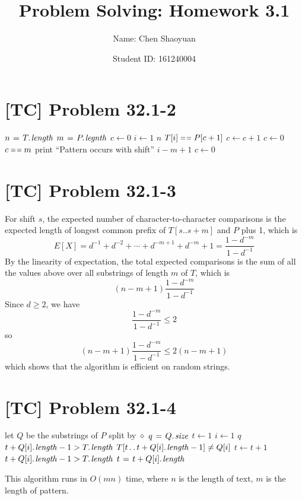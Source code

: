 \documentclass[a4paper,11pt,twocolumn]{article}
\newcommand{\homeworkno}{3.1}
\begin{document}
  \title{Problem Solving: Homework \homeworkno}
  \author{Name: Chen Shaoyuan \and Student ID: 161240004}
  \maketitle

  \section{[TC] Problem 32.1-2}
  \begin{codebox}
  \li $n \gets \attrib{T}{length}$
  \li $m \gets \attrib{P}{legnth}$
  \li $c \gets 0$
  \li \For $i \gets 1$ \To $n$
  \li \Do  \If $T[i] \isequal P[c+1]$
  \li      \Do $c \gets c + 1$
  \li      \Else
  \li          $c \gets 0$
           \End
  \li      \If $c \isequal m$
  \li      \Do print ``Pattern occurs with shift'' $i-m+1$
  \li          $c \gets 0$
           \End
       \End
  \end{codebox}

  \section{[TC] Problem 32.1-3}
  For shift $s$, the expected number of character-to-character comparisons is the expected length of longest common prefix of $T[s..s+m]$ and $P$ plus 1, which is
  $$ E[X] = d^{-1} + d^{-2} + \cdots + d^{-m+1} + d^{-m} + 1 = \frac{1-d^{-m}}{1-d^{-1}}$$
  By the linearity of expectation, the total expected comparisons is the sum of all the values above over all substrings of length $m$ of $T$, which is
  $$ (n-m+1) \frac{1-d^{-m}}{1-d^{-1}} $$
  Since $d \geq 2$, we have
  $$\frac{1-d^{-m}}{1-d^{-1}} \leq 2$$
  so
  $$ (n-m+1) \frac{1-d^{-m}}{1-d^{-1}} \leq 2(n-m+1) $$
  which shows that the algorithm is efficient on random strings.

  \section{[TC] Problem 32.1-4}
  \begin{codebox}
  \li let $Q$ be the substrings of $P$ split by $\diamond$
  \li $q \gets \attrib{Q}{size}$
  \li $t \gets 1$
  \li \For $i \gets 1$ \To $q$
  \li \Do \If $t + \attrib{Q[i]}{length} - 1 > \attrib{T}{length}$
  \li     \Do \Return {}
          \End
  \li     \While $T[t \twodots t + \attrib{Q[i]}{length} - 1] \neq Q[i]$
  \li     \Do $t \gets t + 1$
  \li         \If $t + \attrib{Q[i]}{length} - 1 > \attrib{T}{length}$
  \li         \Do \Return {}
              \End
          \End
  \li     $t \gets t + \attrib{Q[i]}{length}$

      \End
  \li \Return {}
  \end{codebox}
  This algorithm runs in $O(mn)$ time, where $n$ is the length of text, $m$ is the length of pattern.
\end{document}

